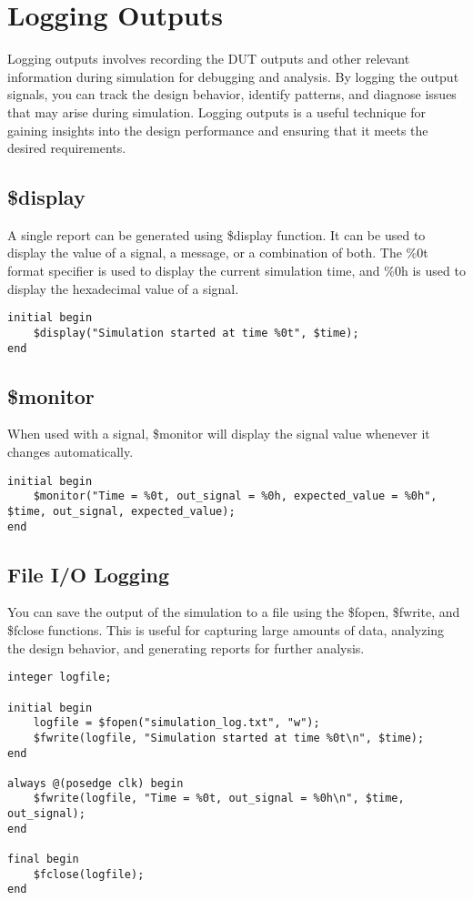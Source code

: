 \documentclass{report}
\begin{document}
\section{Logging Outputs}
Logging outputs involves recording the DUT outputs and other relevant information during simulation for debugging and analysis. By logging the output signals, you can track the design behavior, identify patterns, and diagnose issues that may arise during simulation. Logging outputs is a useful technique for gaining insights into the design performance and ensuring that it meets the desired requirements.\\

\subsection{\$display}

A single report can be generated using \$display function. It can be used to display the value of a signal, a message, or a combination of both. The \%0t format specifier is used to display the current simulation time, and \%0h is used to display the hexadecimal value of a signal.
\begin{verbatim}
initial begin
    $display("Simulation started at time %0t", $time);
end
\end{verbatim}

\subsection{\$monitor}

When used with a signal, \$monitor will display the signal value whenever it changes automatically.
\begin{verbatim}
initial begin
    $monitor("Time = %0t, out_signal = %0h, expected_value = %0h", $time, out_signal, expected_value);
end
\end{verbatim}

\subsection{File I/O Logging}
You can save the output of the simulation to a file using the \$fopen, \$fwrite, and \$fclose functions. This is useful for capturing large amounts of data, analyzing the design behavior, and generating reports for further analysis.
\begin{verbatim}
integer logfile;

initial begin
    logfile = $fopen("simulation_log.txt", "w");
    $fwrite(logfile, "Simulation started at time %0t\n", $time);
end

always @(posedge clk) begin
    $fwrite(logfile, "Time = %0t, out_signal = %0h\n", $time, out_signal);
end

final begin
    $fclose(logfile);
end
\end{verbatim}
\end{document}
